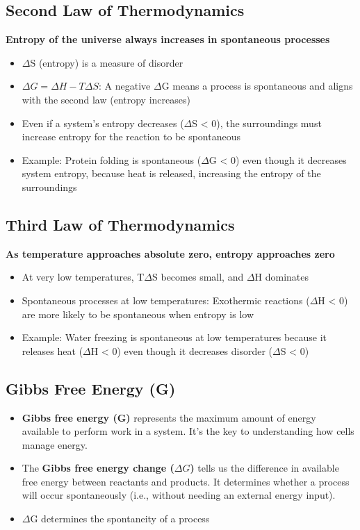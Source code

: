 \documentclass[10pt]{article}
\begin{document}
\subsection*{Second Law of Thermodynamics}
\textbf{Entropy of the universe always increases in spontaneous processes}
\begin{itemize}
    \item $\Delta$S (entropy) is a measure of disorder
    \item $\Delta G = \Delta H - T\Delta S$: A negative $\Delta$G means a process is spontaneous and aligns with the second law (entropy increases)
    \item Even if a system's entropy decreases ($\Delta$S < 0), the surroundings must increase entropy for the reaction to be spontaneous
    \item Example: Protein folding is spontaneous ($\Delta$G < 0) even though it decreases system entropy, because heat is released, increasing the entropy of the surroundings
\end{itemize}

\subsection*{Third Law of Thermodynamics}
\textbf{As temperature approaches absolute zero, entropy approaches zero}
\begin{itemize}
    \item At very low temperatures, T$\Delta$S becomes small, and $\Delta$H dominates
    \item Spontaneous processes at low temperatures: Exothermic reactions ($\Delta$H < 0) are more likely to be spontaneous when entropy is low
    \item Example: Water freezing is spontaneous at low temperatures because it releases heat ($\Delta$H < 0) even though it decreases disorder ($\Delta$S < 0)
\end{itemize}

\subsection*{Gibbs Free Energy (G)}
\begin{itemize}
    \item \textbf{Gibbs free energy (G)} represents the maximum amount of energy available to perform work in a system. It's the key to understanding how cells manage energy.
    \item The \textbf{Gibbs free energy change ($\Delta G$)} tells us the difference in available free energy between reactants and products. It determines whether a process will occur spontaneously (i.e., without needing an external energy input).
    \item $\Delta$G determines the spontaneity of a process
\end{itemize}
\end{document}
